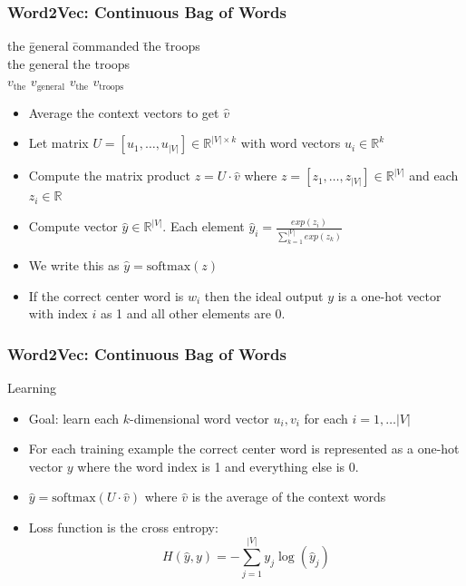 \begin{frame}
\frametitle{Word2Vec: Continuous Bag of Words}
\begin{tabbing}
the \= general \= commanded \= the \= troops\kill \\
the \> general \> \rlap{\underline{\hphantom{commanded}}} \> the \> troops \\
$v_{\textrm{the}}$ \> $v_{\textrm{general}}$ \> \> $v_{\textrm{the}}$ \> $v_{\textrm{troops}}$ 
\end{tabbing}
\begin{itemize}[<+->]
	\item Average the context vectors to get $\hat{v}$
	\item Let matrix $U = [ u_1, \ldots, u_{|V|} ] \in \mathbb{R}^{|V| \times k}$ with word vectors $u_i \in \mathbb{R}^k$
	\item Compute the matrix product $z = U \cdot \hat{v}$ where $z = [ z_1, \ldots, z_{|V|} ] \in \mathbb{R}^{|V|}$ and each $z_i \in \mathbb{R}$
	\item Compute vector $\hat{y} \in \mathbb{R}^{|V|}$. Each element $\hat{y}_i = \frac{exp(z_i)}{\sum_{k=1}^{|V|} exp(z_k)} $
	\item We write this as $\hat{y} = \textrm{softmax}(z)$
	\item If the correct center word is $w_i$ then the ideal output $y$ is a one-hot vector with index $i$ as 1 and all other elements are 0.
\end{itemize}
\end{frame}

\begin{frame}
\frametitle{Word2Vec: Continuous Bag of Words}
\begin{block}{Learning}
\begin{itemize}[<+->]
	\item Goal: learn each $k$-dimensional word vector $u_i, v_i$ for each $i = 1, \ldots |V|$
	\item For each training example the correct center word is represented as a one-hot vector $y$ where the word index is 1 and everything else is 0.
	\item $\hat{y} = \textrm{softmax}(U \cdot \hat{v})$ where $\hat{v}$ is the average of the context words
	\item Loss function is the cross entropy:
	\[ H(\hat{y}, y) = - \sum_{j=1}^{|V|} y_j \log(\hat{y}_j) \]
\end{itemize}	
\end{block}
\end{frame}

